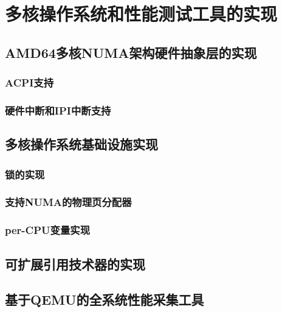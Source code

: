 
\chapter{多核操作系统和性能测试工具的实现}

\section{AMD64多核NUMA架构硬件抽象层的实现}
\subsection{ACPI支持}

\subsection{硬件中断和IPI中断支持}

\section{多核操作系统基础设施实现}
\subsection{锁的实现}

\subsection{支持NUMA的物理页分配器}

\subsection{per-CPU变量实现}


\section{可扩展引用技术器的实现}

\section{基于QEMU的全系统性能采集工具}
